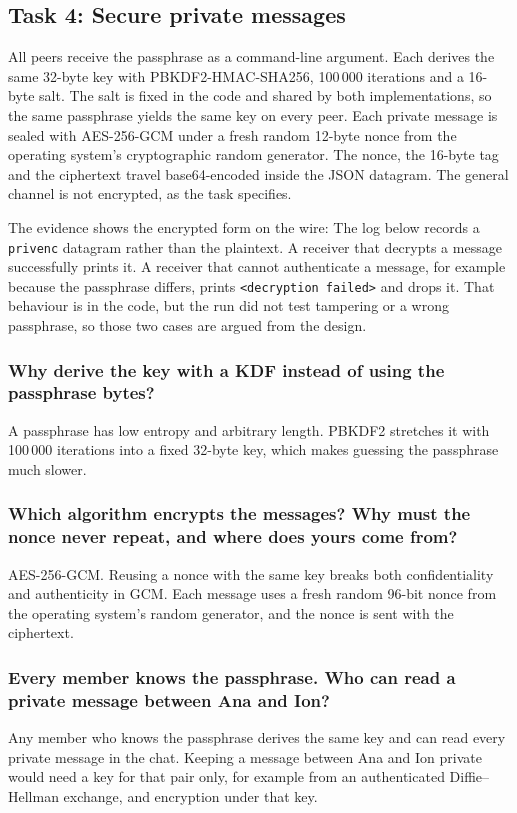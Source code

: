 \documentclass[12pt,a4paper]{article}
\begin{document}
\subsection{Task 4: Secure private messages}
\label{sec:task4}
All peers receive the passphrase as a command-line argument. Each derives the same
32-byte key with PBKDF2-HMAC-SHA256, 100\,000 iterations and a 16-byte salt. The
salt is fixed in the code and shared by both implementations, so the same
passphrase yields the same key on every peer. Each private message is sealed with
AES-256-GCM under a fresh random 12-byte nonce from the
operating system's cryptographic random generator. The nonce, the 16-byte tag and
the ciphertext travel base64-encoded inside the JSON datagram. The general channel
is not encrypted, as the task specifies.

The evidence shows the encrypted form on the wire: The log below records a
\texttt{privenc} datagram rather than the plaintext. A receiver that decrypts a
message successfully prints it. A receiver that cannot authenticate a message, for
example because the passphrase differs, prints \texttt{<decryption failed>} and
drops it. That behaviour is in the code, but the run did not test tampering or a
wrong passphrase, so those two cases are argued from the design.

\subsubsection{Why derive the key with a KDF instead of using the passphrase bytes?}
A passphrase has low entropy and arbitrary length. PBKDF2 stretches it with
100\,000 iterations into a fixed 32-byte key, which makes guessing the passphrase
much slower.

\subsubsection{Which algorithm encrypts the messages? Why must the nonce never repeat, and where does yours come from?}
AES-256-GCM. Reusing a nonce with the same key breaks both confidentiality and
authenticity in GCM. Each message uses a fresh random 96-bit nonce from the
operating system's random generator, and the nonce is sent with the ciphertext.

\subsubsection{Every member knows the passphrase. Who can read a private message between Ana and Ion?}
Any member who knows the passphrase derives the same key and can read every
private message in the chat. Keeping a message between Ana and Ion private would
need a key for that pair only, for example from an authenticated Diffie--Hellman
exchange, and encryption under that key.
\end{document}
